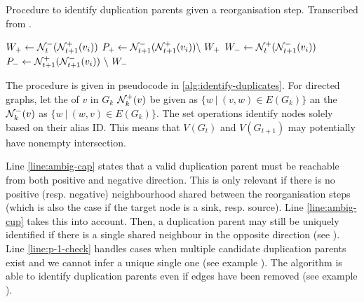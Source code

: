 \documentclass[
	fontsize=10pt, %
	twoside=false, %
	secnumdepth=1, %
]{kaobook}
\begin{document}


\begin{algorithm}[h]
  \DontPrintSemicolon
  \label{alg:identify-duplicates}
  \caption{ Procedure to identify duplication parents given a reorganisation
    step. Transcribed from
    \citeauthor{nielsen_MachineLearningSupport_2019}\cite{nielsen_MachineLearningSupport_2019}.
    }
   
   $W_+ \gets \mathcal{N}_t^- (
  \mathcal{N}_{t+1}^+(v_i) )$ \; $P_+ \gets \mathcal{N}_{t+1}^- ( \mathcal{N}_{t+1}^+(v_i) )
  \backslash~ W_+$ \; $W_- \gets \mathcal{N}_t^+ ( \mathcal{N}_{t+1}^-(v_i) ) $ \; $P_-
  \gets \mathcal{N}_{t+1}^+ ( \mathcal{N}_{t+1}^-(v_i) ) ~\backslash~ W_- $\;
\end{algorithm}

The procedure is given in pseudocode in \ref{alg:identify-duplicates}. For
directed graphs, let the  of $v$ in $G_k$ $\mathcal{N}_k^+(v)$ be
given as $\{w ~|~ (v,w) \in E(G_{k})\}$ an the 
$\mathcal{N}_k^-(v)$ as $\{w ~|~ (w,v) \in E(G_k)\}$.
The set operations identify nodes solely based on their alias ID. This means that
$V(G_t)$ and $V(G_{t+1})$ may potentially have nonempty intersection. 

Line \ref{line:ambig-cap} states that a valid duplication parent must be
reachable from both positive and negative direction. This is only relevant if
there is no positive (resp. negative) neighbourhood shared between the
reorganisation steps (which is also the case if the target node is a sink, 
resp. source). Line \ref{line:ambig-cup} takes this into account. Then, a
duplication parent may still be uniquely identified if there is a single shared
neighbour in the opposite direction (see ).
Line \ref{line:p-1-check} handles cases when multiple candidate duplication
parents exist and we cannot infer a unique single one (see example ).
The algorithm is able to identify duplication parents even if edges have been
removed (see example ).
\end{document}
